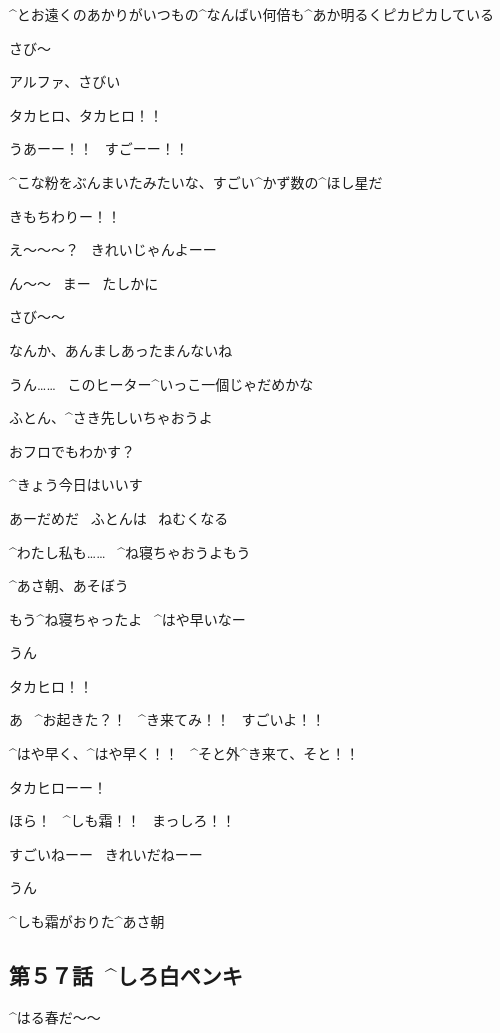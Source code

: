 \Takahiro ^{とお}{遠}くのあかりがいつもの^{なんばい}{何倍}も^{あか}{明}るくピカピカしている

\page
\Alpha さび〜

\Takahiro アルファ、さびい

\Alpha タカヒロ、タカヒロ！！

\page[15]
\Alpha うあーー！！
\ すごーー！！

\Takahiro ^{こな}{粉}をぶんまいたみたいな、すごい^{かず}{数}の^{ほし}{星}だ

\Takahiro きもちわりー！！

\Alpha え〜〜〜？
\ きれいじゃんよーー

\Takahiro ん〜〜
\ まー
\ たしかに

\Takahiro さび〜〜

\page
\Takahiro なんか、あんましあったまんないね

\Alpha うん……
\ このヒーター^{いっこ}{一個}じゃだめかな

\Alpha ふとん、^{さき}{先}しいちゃおうよ

\Alpha おフロでもわかす？

\Takahiro ^{きょう}{今日}はいいす

\page
\Takahiro あーだめだ
\ ふとんは
\ ねむくなる

\Alpha ^{わたし}{私}も……
\ ^{ね}{寝}ちゃおうよもう

\Alpha ^{あさ}{朝}、あそぼう

\page
\Takahiro もう^{ね}{寝}ちゃったよ
\ ^{はや}{早}いなー

\page
\Alpha うん

\page
\Alpha タカヒロ！！

\page
\Alpha あ
\ ^{お}{起}きた？！
\ ^{き}{来}てみ！！
\ すごいよ！！

\Alpha ^{はや}{早}く、^{はや}{早}く！！
\ ^{そと}{外}^{き}{来}て、そと！！

\Alpha タカヒローー！

\page
\Alpha ほら！
\ ^{しも}{霜}！！
\ まっしろ！！

\page
\Alpha すごいねーー
\ きれいだねーー

\page
\Takahiro うん

\Takahiro ^{しも}{霜}がおりた^{あさ}{朝}


\subsection{第５７話\ ^{しろ}{白}ペンキ}

\page[27]
\Alpha ^{はる}{春}だ〜〜

